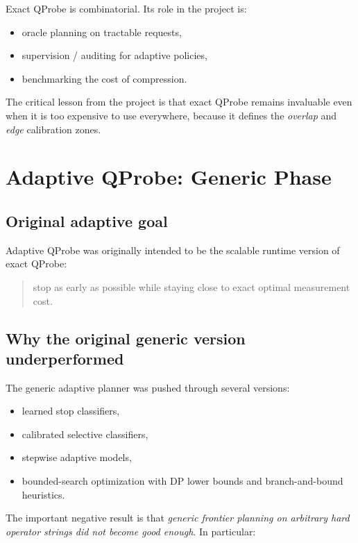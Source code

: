 \documentclass[11pt]{article}
\begin{document}
Exact QProbe is combinatorial. Its role in the project is:

\begin{itemize}
\item oracle planning on tractable requests,
\item supervision / auditing for adaptive policies,
\item benchmarking the cost of compression.
\end{itemize}

The critical lesson from the project is that exact QProbe remains invaluable even when it is too expensive to use everywhere, because it defines the \emph{overlap} and \emph{edge} calibration zones.

\section{Adaptive QProbe: Generic Phase}

\subsection{Original adaptive goal}

Adaptive QProbe was originally intended to be the scalable runtime version of exact QProbe:

\begin{quote}
stop as early as possible while staying close to exact optimal measurement cost.
\end{quote}

\subsection{Why the original generic version underperformed}

The generic adaptive planner was pushed through several versions:

\begin{itemize}
\item learned stop classifiers,
\item calibrated selective classifiers,
\item stepwise adaptive models,
\item bounded-search optimization with DP lower bounds and branch-and-bound heuristics.
\end{itemize}

The important negative result is that \emph{generic frontier planning on arbitrary hard operator strings did not become good enough}. In particular:
\end{document}
